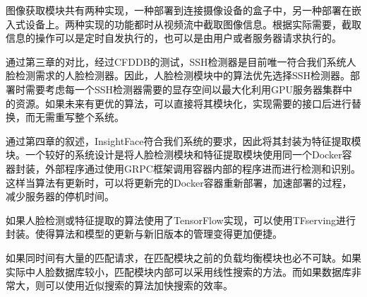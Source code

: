 图像获取模块共有两种实现，一种部署到连接摄像设备的盒子中，另一种部署在嵌入式设备上。两种实现的功能都时从视频流中截取图像信息。根据实际需要，截取信息的操作可以是定时自发执行的，也可以是由用户或者服务器请求执行的。

通过第三章的对比，经过CFDDB的测试，SSH检测器\cite{najibi2017ssh}是目前唯一符合我们系统人脸检测需求的人脸检测器。因此，人脸检测模块中的算法优先选择SSH检测器。部署时需要考虑每一个SSH检测器需要的显存空间以最大化利用GPU服务器集群中的资源。如果未来有更优的算法，可以直接将其模块化，实现需要的接口后进行替换，而无需重写整个系统。

通过第四章的叙述，InsightFace\cite{deng2018arcface}符合我们系统的要求，因此将其封装为特征提取模块。一个较好的系统设计是将人脸检测模块和特征提取模块使用同一个Docker容器封装，外部程序通过使用GRPC框架调用容器内部的程序进而进行检测和识别。这样当算法有更新时，可以将更新完的Docker容器重新部署，加速部署的过程，减少服务器的停机时间。

如果人脸检测或特征提取的算法使用了TensorFlow实现，可以使用TFserving进行封装。使得算法和模型的更新与新旧版本的管理变得更加便捷。

如果同时间有大量的匹配请求，在匹配模块之前的负载均衡模块也必不可缺。如果实际中人脸数据库较小，匹配模块内部可以采用线性搜索的方法。而如果数据库非常大，则可以使用近似搜索的算法加快搜索的效率。



